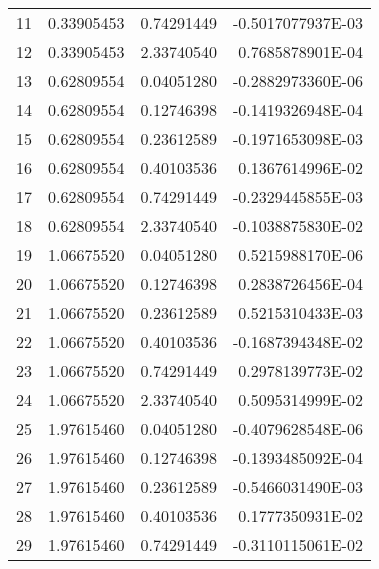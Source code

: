 \begin{longtable}{@{\extracolsep{\fill}}cllr@{}}
11  &  0.33905453  &  0.74291449  &  -0.5017077937E-03 \\

12  &  0.33905453  &  2.33740540  &   0.7685878901E-04 \\

13  &  0.62809554  &  0.04051280  &  -0.2882973360E-06 \\

14  &  0.62809554  &  0.12746398  &  -0.1419326948E-04 \\

15  &  0.62809554  &  0.23612589  &  -0.1971653098E-03 \\

16  &  0.62809554  &  0.40103536  &   0.1367614996E-02 \\

17  &  0.62809554  &  0.74291449  &  -0.2329445855E-03 \\

18  &  0.62809554  &  2.33740540  &  -0.1038875830E-02 \\

19  &  1.06675520  &  0.04051280  &   0.5215988170E-06 \\

20  &  1.06675520  &  0.12746398  &   0.2838726456E-04 \\

21  &  1.06675520  &  0.23612589  &   0.5215310433E-03 \\

22  &  1.06675520  &  0.40103536  &  -0.1687394348E-02 \\

23  &  1.06675520  &  0.74291449  &   0.2978139773E-02 \\

24  &  1.06675520  &  2.33740540  &   0.5095314999E-02 \\

25  &  1.97615460  &  0.04051280  &  -0.4079628548E-06 \\

26  &  1.97615460  &  0.12746398  &  -0.1393485092E-04 \\

27  &  1.97615460  &  0.23612589  &  -0.5466031490E-03 \\

28  &  1.97615460  &  0.40103536  &   0.1777350931E-02 \\

29  &  1.97615460  &  0.74291449  &  -0.3110115061E-02 \\


\end{longtable}
